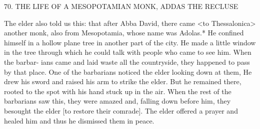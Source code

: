 70.
THE LIFE OF A MESOPOTAMIAN MONK,
ADDAS THE RECLUSE

The elder also told us this: that after Abba David, there came <to
Thessalonica> another monk, also from Mesopotamia, whose name
was Adolas.* He confined himself in a hollow plane tree in another
part of the city.
He made a little window in the tree through which
he could talk with people who came to see him.
When the barbar-
ians came and laid waste all the countryside, they happened to pass
by that place.
One of the barbarians noticed the elder looking down
at them, He drew his sword and raised his arm to strike the elder.
But he remained there, rooted to the spot with his hand stuck up in
the air.
When the rest of the barbarians saw this, they were amazed
and, falling down before him, they besought the elder [to restore
their comrade].
The elder offered a prayer and healed him and thus
he dismissed them in peace.

